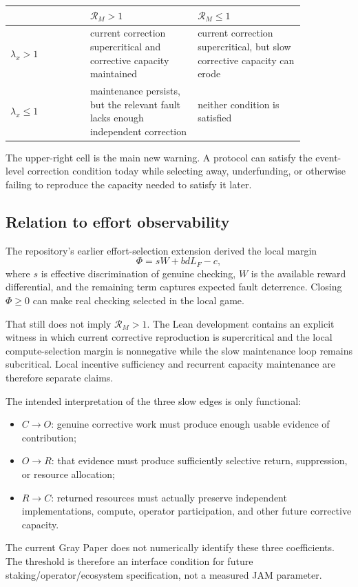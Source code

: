 \begin{center}
\begin{tabular}{p{0.23\linewidth}p{0.31\linewidth}p{0.31\linewidth}}
\toprule
 & \(\mathcal R_M>1\) & \(\mathcal R_M\le1\) \\
\midrule
\(\lambda_x>1\) & current correction supercritical and corrective capacity maintained & current correction supercritical, but slow corrective capacity can erode \\
\addlinespace
\(\lambda_x\le1\) & maintenance persists, but the relevant fault lacks enough independent correction & neither condition is satisfied \\
\bottomrule
\end{tabular}
\end{center}

The upper-right cell is the main new warning.  A protocol can satisfy the event-level correction condition today while selecting away, underfunding, or otherwise failing to reproduce the capacity needed to satisfy it later.

\subsection{Relation to effort observability}

The repository's earlier effort-selection extension derived the local margin
\[
\Phi=sW+bdL_F-c,
\]
where \(s\) is effective discrimination of genuine checking, \(W\) is the available reward differential, and the remaining term captures expected fault deterrence.  Closing \(\Phi\ge0\) can make real checking selected in the local game.

That still does not imply \(\mathcal R_M>1\).  The Lean development contains an explicit witness in which current corrective reproduction is supercritical and the local compute-selection margin is nonnegative while the slow maintenance loop remains subcritical.  Local incentive sufficiency and recurrent capacity maintenance are therefore separate claims.

The intended interpretation of the three slow edges is only functional:
\begin{itemize}
\item \(C\to O\): genuine corrective work must produce enough usable evidence of contribution;
\item \(O\to R\): that evidence must produce sufficiently selective return, suppression, or resource allocation;
\item \(R\to C\): returned resources must actually preserve independent implementations, compute, operator participation, and other future corrective capacity.
\end{itemize}
The current Gray Paper does not numerically identify these three coefficients.  The threshold is therefore an interface condition for future staking/operator/ecosystem specification, not a measured JAM parameter.

